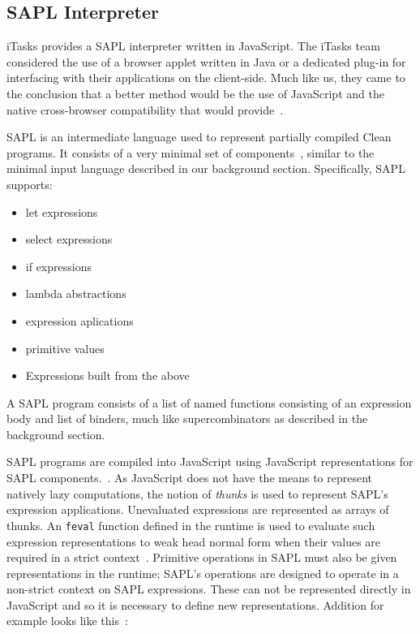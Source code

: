 \subsection{SAPL Interpreter}
iTasks provides a SAPL interpreter written in JavaScript. The iTasks
team considered the use of a browser applet written in Java or a
dedicated plug-in for interfacing with their applications on the 
client-side. Much like us, they came to the conclusion that a better
method would be the use of JavaScript and the native cross-browser 
compatibility that would provide~\cite[pp.77]{JEL}.  

SAPL is an intermediate language used to represent partially compiled
Clean programs. It consists of a very minimal set of components~\cite[pp.79]{JEL}, 
similar to the minimal input language described in our background
section. Specifically, SAPL supports:

\begin{itemize}
  \item let expressions
  \item select expressions
  \item if expressions
  \item lambda abstractions
  \item expression aplications
  \item primitive values
  \item Expressions built from the above
\end{itemize}

\noindent A SAPL program consists of a list of named functions consisting
of an expression body and list of binders, much like supercombinators as
described in the background section.

SAPL programs are compiled into JavaScript using JavaScript representations
for SAPL components.~\cite[pp.79]{JEL}. As JavaScript does not have the
means to represent natively lazy computations, the notion of \emph{thunks} is
used to represent SAPL's expression applications. Unevaluated expressions
are represented as arrays of thunks. An \verb!feval! function defined in the runtime is 
used to evaluate such expression representations to weak head normal form
when their values are required in a strict context~\cite[pp.84]{JEL}. Primitive operations in SAPL 
must also be given representations in the runtime; SAPL's operations are
designed to operate in a non-strict context on SAPL expressions. These
can not be represented directly in JavaScript and so it is necessary
to define new representations. Addition for example looks like this~\cite[pp.83]{JEL}:

